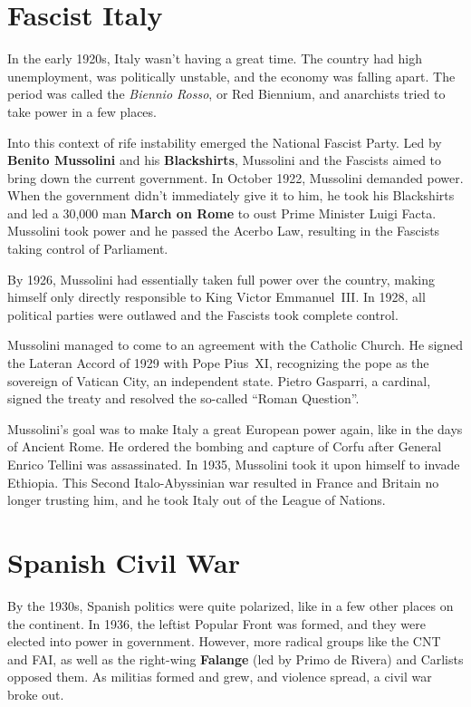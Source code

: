 \section{Fascist Italy}

In the early 1920s, Italy wasn't having a great time.
The country had high unemployment, was politically unstable, and the economy was falling apart.
The period was called the \textit{Biennio Rosso}, or Red Biennium,
and anarchists tried to take power in a few places.

Into this context of rife instability emerged the National Fascist Party.
Led by \textbf{Benito Mussolini} and his \textbf{Blackshirts},
Mussolini and the Fascists aimed to bring down the current government.
In October 1922, Mussolini demanded power.
When the government didn't immediately give it to him,
he took his Blackshirts and led a 30,000 man \textbf{March on Rome} to oust Prime Minister Luigi Facta.
Mussolini took power and he passed the Acerbo Law, resulting in the Fascists taking control of Parliament.

By 1926, Mussolini had essentially taken full power over the country,
making himself only directly responsible to King Victor Emmanuel~III\@.
In 1928, all political parties were outlawed and the Fascists took complete control.

Mussolini managed to come to an agreement with the Catholic Church.
He signed the Lateran Accord of 1929 with Pope Pius~XI,
recognizing the pope as the sovereign of Vatican City, an independent state.
Pietro Gasparri, a cardinal, signed the treaty and resolved the so-called ``Roman Question''.

Mussolini's goal was to make Italy a great European power again, like in the days of Ancient Rome.
He ordered the bombing and capture of Corfu after General Enrico Tellini was assassinated.
In 1935, Mussolini took it upon himself to invade Ethiopia.
This Second Italo-Abyssinian war resulted in France and Britain no longer trusting him,
and he took Italy out of the League of Nations.

\section{Spanish Civil War}

By the 1930s, Spanish politics were quite polarized, like in a few other places on the continent.
In 1936, the leftist Popular Front was formed, and they were elected into power in government.
However, more radical groups like the CNT and FAI,
as well as the right-wing \textbf{Falange} (led by Primo de Rivera) and Carlists opposed them.
As militias formed and grew, and violence spread, a civil war broke out.


